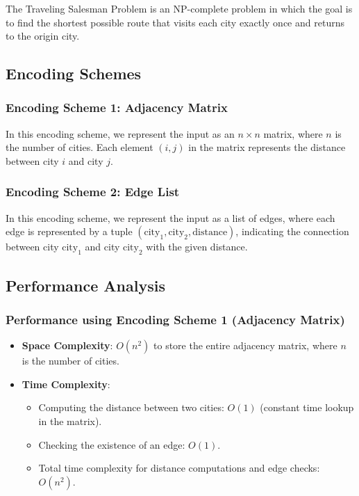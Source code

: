 \documentclass{article}
\renewcommand{\_}{\ifincsname_\else\legacyunderscore\fi}
\begin{document}
The Traveling Salesman Problem is an NP-complete problem in which the goal is to find the shortest possible route that visits each city exactly once and returns to the origin city.

\subsection{Encoding Schemes}

\subsubsection{Encoding Scheme 1: Adjacency Matrix}

In this encoding scheme, we represent the input as an $n \times n$ matrix, where $n$ is the number of cities. Each element $(i, j)$ in the matrix represents the distance between city $i$ and city $j$.

\subsubsection{Encoding Scheme 2: Edge List}

In this encoding scheme, we represent the input as a list of edges, where each edge is represented by a tuple $(\text{city}_1, \text{city}_2, \text{distance})$, indicating the connection between city $\text{city}_1$ and city $\text{city}_2$ with the given distance.

\subsection{Performance Analysis}

\subsubsection{Performance using Encoding Scheme 1 (Adjacency Matrix)}

\begin{itemize}
    \item \textbf{Space Complexity}: $O(n^2)$ to store the entire adjacency matrix, where $n$ is the number of cities.
    \item \textbf{Time Complexity}:
    \begin{itemize}
        \item Computing the distance between two cities: $O(1)$ (constant time lookup in the matrix).
        \item Checking the existence of an edge: $O(1)$.
        \item Total time complexity for distance computations and edge checks: $O(n^2)$.
    \end{itemize}
\end{itemize}
\end{document}
